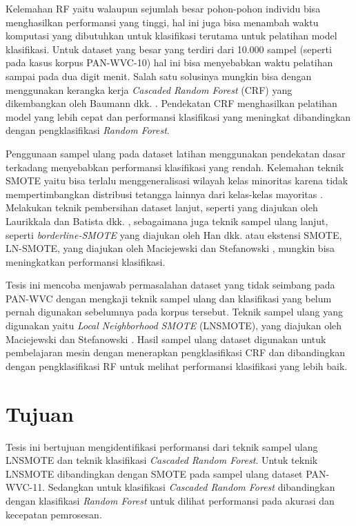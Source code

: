 Kelemahan RF yaitu walaupun sejumlah besar pohon-pohon individu
bisa menghasilkan performansi yang tinggi, hal ini juga bisa menambah waktu
komputasi yang dibutuhkan untuk klasifikasi terutama untuk pelatihan model
klasifikasi.
Untuk dataset yang besar yang terdiri dari 10.000 sampel (seperti pada kasus
korpus PAN-WVC-10) hal ini bisa menyebabkan waktu pelatihan sampai pada dua
digit menit.
Salah satu solusinya mungkin bisa dengan menggunakan kerangka kerja
\textit{Cascaded Random Forest} (CRF)
yang dikembangkan oleh Baumann dkk.
\cite{baumann2013cascaded}.
Pendekatan CRF menghasilkan pelatihan model yang lebih cepat dan performansi
klasifikasi yang meningkat dibandingkan dengan pengklasifikasi \textit{Random
Forest}.

Penggunaan sampel ulang pada dataset latihan menggunakan pendekatan dasar
terkadang menyebabkan performansi klasifikasi yang rendah.
Kelemahan teknik SMOTE yaitu bisa terlalu menggeneralisasi wilayah kelas
minoritas karena tidak mempertimbangkan distribusi tetangga lainnya dari
kelas-kelas mayoritas
\cite{maciejewski2011local}.
Melakukan teknik pembersihan dataset lanjut, seperti yang diajukan oleh
Laurikkala
\cite{laurikkala2001improving}
dan Batista dkk.
\cite{batista2004study},
sebagaimana juga teknik sampel ulang lanjut, seperti
\textit{borderline-SMOTE}
yang diajukan oleh Han dkk.
\cite{han2005borderline}
atau ekstensi SMOTE, LN-SMOTE, yang diajukan oleh Maciejewski dan Stefanowski 
\cite{maciejewski2011local},
mungkin bisa meningkatkan performansi klasifikasi.

Tesis ini mencoba menjawab permasalahan dataset yang tidak seimbang pada
PAN-WVC dengan mengkaji teknik sampel ulang dan klasifikasi yang belum pernah
digunakan sebelumnya pada korpus tersebut.
Teknik sampel ulang yang digunakan yaitu
\textit{Local Neighborhood SMOTE} (LNSMOTE),
yang diajukan oleh Maciejewski dan
Stefanowski 
\cite{maciejewski2011local}.
Hasil sampel ulang dataset digunakan untuk pembelajaran mesin dengan menerapkan
pengklasifikasi CRF dan dibandingkan dengan pengklasifikasi RF untuk melihat
performansi klasifikasi yang lebih baik.


\section{Tujuan}
\label{sec:tujuan}

Tesis ini bertujuan mengidentifikasi performansi dari teknik sampel ulang
LNSMOTE dan teknik klasifikasi
\textit{Cascaded Random Forest}.
Untuk teknik LNSMOTE dibandingkan dengan SMOTE pada sampel ulang dataset
PAN-WVC-11.
Sedangkan untuk klasifikasi
\textit{Cascaded Random Forest}
dibandingkan dengan klasifikasi
\textit{Random Forest}
untuk dilihat performansi pada akurasi dan kecepatan pemrosesan.

